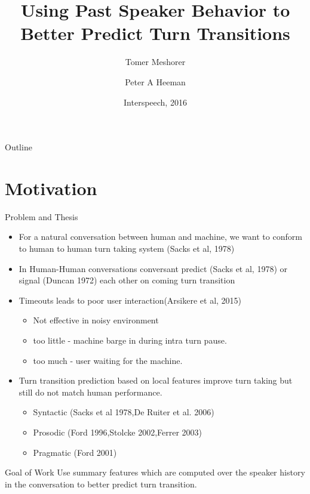 \documentclass[t]{beamer}
\title{Using Past Speaker Behavior to Better Predict Turn Transitions}
\author{Tomer Meshorer \and Peter A Heeman}
\institute[] %
{
  \inst{}
 Center for Spoken Language Understanding\\
 Oregon Health \& Science University, Portland, Oregon,USA
 }
\date{Interspeech, 2016}
\begin{document}
\begin{frame}
  \titlepage
\end{frame}

\begin{frame}{Outline}
  \tableofcontents
\end{frame}

\section{Motivation}
\begin{frame}{Problem and Thesis}
  \begin{itemize}
  \item For a natural conversation between human and machine, we want to conform
        to human to human turn taking system (Sacks et al, 1978)
  \item In Human-Human conversations conversant predict (Sacks et al, 1978) or 
        signal (Duncan 1972) each other on coming turn transition
  \item {
    Timeouts leads to poor user interaction(Arsikere et al, 2015)
    \begin{itemize}
        \item Not effective in noisy environment
        \item too little - machine barge in during intra turn pause.
        \item too much - user waiting for the machine.
    \end{itemize}
  }
  \item {
    Turn transition prediction based on local features improve turn taking but still
    do not match human performance.
    \begin{itemize}
        \item Syntactic (Sacks et al 1978,De Ruiter et al. 2006)
        \item Prosodic (Ford 1996,Stolcke 2002,Ferrer 2003) 
        \item Pragmatic (Ford 2001)
    \end{itemize}
  }
  \end{itemize}
\end{frame}

\begin{frame}
  \begin{block}{Goal of Work}
   Use summary features which are computed over the speaker history in
   the conversation to better predict turn transition.
  \end{block}
\end{frame}
\end{document}
